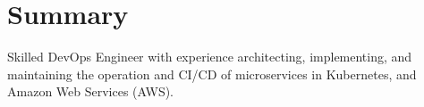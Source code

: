 \section*{Summary}
Skilled DevOps Engineer with experience architecting, implementing, and
maintaining the operation and CI/CD of microservices in Kubernetes, and Amazon
Web Services (AWS).
\newline